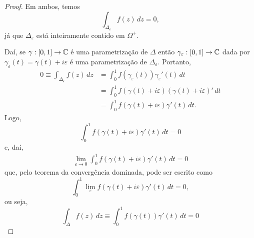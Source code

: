 \begin{proof}
        Em ambos, temos
        \begin{equation*}
            \int_{\Delta_{\varepsilon}} f(z)\, dz = 0,
        \end{equation*}
        já que $\Delta_{\varepsilon}$ está inteiramente contido em $\Omega^+$.
        
        Daí, se $\gamma:[0,1]\to\mathbb{C}$ é uma parametrização de $\Delta$ então
        $\gamma_{\varepsilon}:[0,1]\to\mathbb{C}$ dada por 
        $\gamma_{\varepsilon}(t) = \gamma(t) + i\varepsilon$ é uma parametrização de
        $\Delta_{\varepsilon}$. Portanto,
        \begin{align*}
            0 \equiv \int_{\Delta_{\varepsilon}} f(z)\, dz 
            &= \int_0^1 f(\gamma_{\varepsilon}(t))\gamma_{\varepsilon}'(t)\, dt \\
            &= \int_0^1 f(\gamma(t) + i\varepsilon)(\gamma(t) + i\varepsilon)'\, dt \\
            &= \int_0^1 f(\gamma(t) + i\varepsilon)\gamma'(t)\, dt.
        \end{align*}
        Logo, 
        \begin{equation*}
            \int_0^1 f(\gamma(t) + i\varepsilon)\gamma'(t)\, dt = 0
        \end{equation*}
        e, daí,
        \begin{align*}
            \lim_{\varepsilon\to 0} \int_0^1 f(\gamma(t) + i\varepsilon)\gamma'(t)\, dt = 0
        \end{align*}
        que, pelo teorema da convergência dominada, pode ser escrito como
        \begin{equation*}
            \int_0^1 \lim_{\varepsilon}f(\gamma(t) + i\varepsilon)\gamma'(t)\, dt = 0,
        \end{equation*}
        ou seja,
        \begin{equation*}
            \int_{\Delta} f(z)\, dz \equiv \int_0^1 f(\gamma(t))\gamma'(t)\, dt = 0
        \end{equation*}
        

\end{proof}
